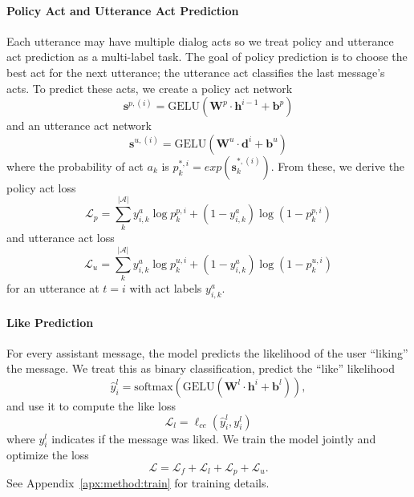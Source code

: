 \paragraph{Policy Act and Utterance Act Prediction}
Each utterance may have multiple dialog acts so we treat policy and utterance act prediction as a multi-label task.
The goal of policy prediction is to choose the best act for the next utterance; the utterance act classifies the last message's acts.
To predict these acts, we create a policy act network
\begin{equation}
    \bm{s}^{p,(i)} = \text{GELU}(\bm{W}^p\cdot \bm{h}^{i-1} + \bm{b}^p)
\end{equation}
and an utterance act network
\begin{equation}
    \bm{s}^{u,(i)} = \text{GELU}(\bm{W}^u\cdot \bm{d}^i + \bm{b}^u)
\end{equation}
where the probability of act $a_k$ is $p^{*,i}_k=exp(\bm{s}^{*,(i)}_k)$.
From these, we derive the policy act loss
\begin{equation}
    \mathcal{L}_p=\sum_k^{\left|\mathcal{A}\right|}y^a_{i,k}\log p^{p,i}_k + (1-y^a_{i,k})\log (1-p^{p,i}_k)
\end{equation}
and utterance act loss
\begin{equation}
    \mathcal{L}_u=\sum_k^{\left|\mathcal{A}\right|}y^a_{i,k}\log p^{u,i}_k + (1-y^a_{i,k})\log (1-p^{u,i}_k)
\end{equation}
for an utterance at $t=i$ with act labels $y^a_{i,k}$.

\paragraph{Like Prediction}
For every assistant message, the model predicts the likelihood of the user ``liking'' the message.
We treat this as binary classification, predict the ``like'' likelihood
\begin{equation}
    \hat{y}^l_i=\text{softmax}(\text{GELU}(\bm{W}^l\cdot \bm{h}^i + \bm{b}^l)),
\end{equation}
and use it to compute the like loss
\begin{equation}
    \mathcal{L}_l=\ell_{ce}(\hat{y}^l_i,y^l_i)
\end{equation}
where $y^l_i$ indicates if the message was liked.
We train the model jointly and optimize the loss
\begin{equation}
    \mathcal{L}=\mathcal{L}_f+\mathcal{L}_l+\mathcal{L}_p+\mathcal{L}_u.
\end{equation}
See Appendix~\ref{apx:method:train} for training details.
